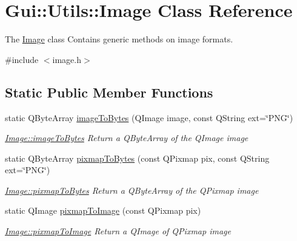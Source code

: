 \hypertarget{classGui_1_1Utils_1_1Image}{\section{Gui\-:\-:Utils\-:\-:Image Class Reference}
\label{classGui_1_1Utils_1_1Image}
}


The \hyperlink{classGui_1_1Utils_1_1Image}{Image} class Contains generic methods on image formats.  




{\ttfamily \#include $<$image.\-h$>$}

\subsection*{Static Public Member Functions}
\begin{DoxyCompactItemize}
\item 
static Q\-Byte\-Array \hyperlink{classGui_1_1Utils_1_1Image_aad7d91d84d4d6f51080eee06419aee80}{image\-To\-Bytes} (Q\-Image image, const Q\-String ext=\char`\"{}P\-N\-G\char`\"{})
\begin{DoxyCompactList}\small\item\em \hyperlink{classGui_1_1Utils_1_1Image_aad7d91d84d4d6f51080eee06419aee80}{Image\-::image\-To\-Bytes} Return a Q\-Byte\-Array of the Q\-Image {\itshape image} \end{DoxyCompactList}\item 
static Q\-Byte\-Array \hyperlink{classGui_1_1Utils_1_1Image_a6bf05a411daec780f12a690d0ce7a046}{pixmap\-To\-Bytes} (const Q\-Pixmap pix, const Q\-String ext=\char`\"{}P\-N\-G\char`\"{})
\begin{DoxyCompactList}\small\item\em \hyperlink{classGui_1_1Utils_1_1Image_a6bf05a411daec780f12a690d0ce7a046}{Image\-::pixmap\-To\-Bytes} Return a Q\-Byte\-Array of the Q\-Pixmap {\itshape image} \end{DoxyCompactList}\item 
static Q\-Image \hyperlink{classGui_1_1Utils_1_1Image_abd2651b6ee762ee438231288887235df}{pixmap\-To\-Image} (const Q\-Pixmap pix)
\begin{DoxyCompactList}\small\item\em \hyperlink{classGui_1_1Utils_1_1Image_abd2651b6ee762ee438231288887235df}{Image\-::pixmap\-To\-Image} Return a Q\-Image of Q\-Pixmap {\itshape image} \end{DoxyCompactList}\item 

\end{DoxyCompactItemize}
